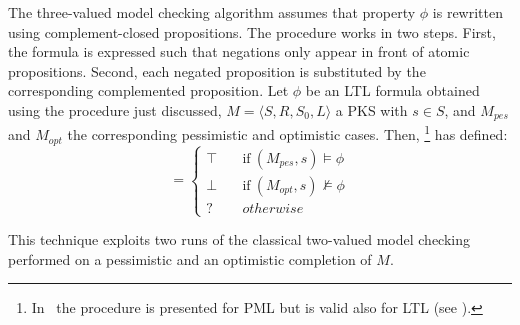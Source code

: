 The three-valued model checking algorithm assumes that property $\phi$ is rewritten using complement-closed propositions. 
The procedure works in two steps.
First, the formula is expressed such that negations only appear in front of atomic propositions. 
Second, each negated proposition is substituted by the corresponding complemented proposition.
Let $\phi$ be an LTL formula obtained using the procedure just discussed, $M=\langle S, R, S_0, L\rangle $ a PKS with $s \in S$, and $M_{pes}$ and $M_{opt}$ the corresponding pessimistic and optimistic cases. 
%
\setcounter{footnote}{0}
Then, \cite{bruns2000model}\footnote{In~\cite{bruns2000model} the procedure is presented for PML but is valid also for LTL (see \cite{bruns2000model,godefroid2005MCvsGMC,godefroid2011ltl}).} has defined:
\begin{equation}
    [(M,s)\models\phi]  = 
                						 \begin{cases}
                  				 				\top & \quad \text{if}\ (M_{pes},s)\models\phi\\
                  								\bot & \quad \text{if}\ (M_{opt},s)\not\models\phi\\
                  								? & \quad  otherwise
                						\end{cases} \nonumber
\end{equation}

This technique exploits two runs of the classical two-valued model checking performed  on a pessimistic and an optimistic completion of  $M$.







